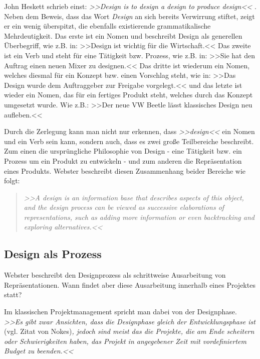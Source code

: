 \medskip John Heskett schrieb einst: \emph{>>Design is to design a design to produce design<<} \citep{Heskett:2005}. Neben dem Beweis, dass das Wort \emph{Design} an sich bereits Verwirrung stiftet, zeigt er ein wenig überspitzt, die ebenfalls existierende grammatikalische Mehrdeutigkeit. Das erste ist ein Nomen und beschreibt Design als generellen Überbegriff, wie z.B. in: >>Design ist wichtig für die Wirtschaft.<< Das zweite ist ein Verb und steht für eine Tätigkeit bzw. Prozess, wie z.B. in: >>Sie hat den Auftrag einen neuen Mixer zu designen.<< Das dritte ist wiederum ein Nomen, welches diesmal für ein Konzept bzw. einen Vorschlag steht, wie in: >>Das Design wurde dem Auftraggeber zur Freigabe vorgelegt.<< und das letzte ist wieder ein Nomen, das für ein fertiges Produkt steht, welches durch das Konzept umgesetzt wurde. Wie z.B.: >>Der neue VW Beetle lässt klassisches Design neu aufleben.<< \citep{Heskett:2005}

Durch die Zerlegung kann man nicht nur erkennen, dass \emph{>>design<<} ein Nomen und ein Verb sein kann, sondern auch, dass es zwei große Teilbereiche beschreibt. Zum einen die ursprüngliche Philosophie von Design - eine Tätigkeit bzw. ein Prozess um ein Produkt zu entwickeln - und zum anderen die Repräsentation eines Produkts. Webster beschreibt diesen Zusammenhang beider Bereiche wie folgt:
\begin{quote}
\slshape >>A design is an information base that describes aspects of this object, and the design process can be viewed as successive elaborations of representations, such as adding more information or even backtracking and exploring alternatives.<< 
\begin{flushright}\citep{Webster:1988}\end{flushright}
\end{quote}

\subsection{Design als Prozess} 
Webster beschreibt den Designprozess als schrittweise Ausarbeitung von Repräsentationen. Wann findet aber diese Ausarbeitung innerhalb eines Projektes statt? 

Im klassischen Projektmanagement spricht man dabei von der Designphase. \emph{>>Es gibt zwar Ansichten, dass die Designphase gleich der Entwicklungsphase ist} (vgl. Zitat von Nokes)\emph{, jedoch sind meist das die Projekte, die am Ende scheitern oder Schwierigkeiten haben, das Projekt in angegebener Zeit mit vordefiniertem Budget zu beenden.<<} \citep{Sagmeister:2008}

